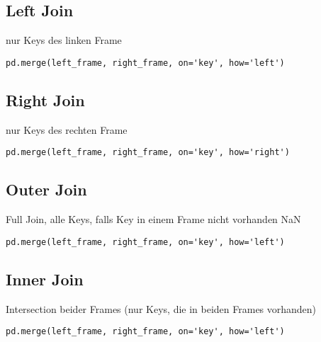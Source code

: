 \subsection{Left Join}
nur Keys des linken Frame
\begin{lstlisting}
pd.merge(left_frame, right_frame, on='key', how='left')
\end{lstlisting}
\subsection{Right Join}
nur Keys des rechten Frame
\begin{lstlisting}
pd.merge(left_frame, right_frame, on='key', how='right')
\end{lstlisting}
\subsection{Outer Join}
Full Join, alle Keys, falls Key in einem Frame nicht vorhanden NaN
\begin{lstlisting}
pd.merge(left_frame, right_frame, on='key', how='left')
\end{lstlisting}
\subsection{Inner Join}
Intersection beider Frames (nur Keys, die in beiden Frames vorhanden)
\begin{lstlisting}
pd.merge(left_frame, right_frame, on='key', how='left')
\end{lstlisting}














